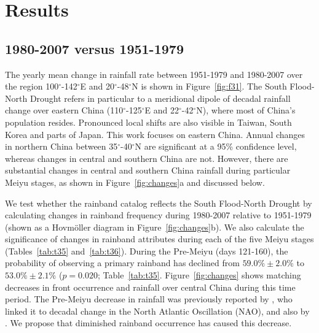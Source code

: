 \documentclass{ametsoc}
\begin{document}
\section{Results}

\subsection{1980-2007 versus 1951-1979}

	The yearly mean change in rainfall rate between 1951-1979 and 1980-2007 over the region 100$^{\circ}$-142$^{\circ}$E and 20$^{\circ}$-48$^{\circ}$N is shown in Figure~\ref{fig:f31}. The South Flood-North Drought refers in particular to a meridional dipole of decadal rainfall change over eastern China (110$^{\circ}$-125$^{\circ}$E and 22$^{\circ}$-42$^{\circ}$N), where most of China's population resides. Pronounced local shifts are also visible in Taiwan, South Korea and parts of Japan. This work focuses on eastern China. Annual changes in northern China between 35$^{\circ}$-40$^{\circ}$N are significant at a 95\% confidence level, whereas changes in central and southern China are not. However, there are substantial changes in central and southern China rainfall during particular Meiyu stages, as shown in Figure~\ref{fig:changes}a and discussed below.
		
	We test whether the rainband catalog reflects the South Flood-North Drought by calculating changes in rainband frequency during 1980-2007 relative to 1951-1979 (shown as a Hovm\"oller diagram in Figure~\ref{fig:changes}b). We also calculate the significance of changes in rainband attributes during each of the five Meiyu stages (Tables~\ref{tab:t35} and~\ref{tab:t36}). During the Pre-Meiyu (days 121-160), the probability of observing a primary rainband has declined from $59.0\% \pm 2.0\%$ to $53.0\% \pm 2.1\%$ ($p=0.020$; Table~\ref{tab:t35}. Figure~\ref{fig:changes} shows matching decreases in front occurrence and rainfall over central China during this time period. The Pre-Meiyu decrease in rainfall was previously reported by \citet{Xin2006}, who linked it to decadal change in the North Atlantic Oscillation (NAO), and also by \citet{Wang2009}. We propose that diminished rainband occurrence has caused this decrease.
		
\end{document}
